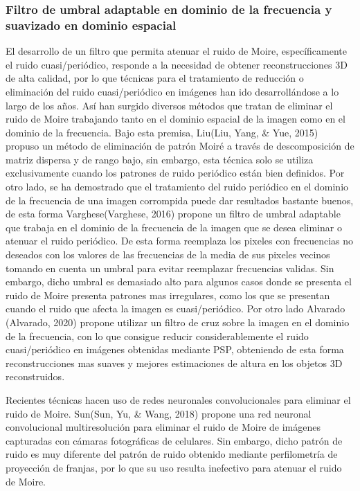 \documentclass[10pt,letterpaper]{article}
\begin{document}
\subsubsection{Filtro de umbral adaptable en dominio de la frecuencia y suavizado en dominio espacial}
El desarrollo de un filtro que permita atenuar el ruido de Moire, específicamente el ruido cuasi/periódico, responde a la necesidad de obtener reconstrucciones 3D de alta calidad, por lo que técnicas para el tratamiento de reducción o eliminación del ruido cuasi/periódico en imágenes han ido desarrollándose a lo largo de los años. Así han surgido diversos métodos que tratan de eliminar el ruido de Moire trabajando tanto en el dominio espacial de la imagen como en el dominio de la frecuencia. Bajo esta premisa, Liu(Liu, Yang, \& Yue, 2015)\cite{Liu:Yang} propuso un método de eliminación de patrón Moiré a través de descomposición de matriz dispersa y de rango bajo, sin embargo, esta técnica solo se utiliza exclusivamente cuando los patrones de ruido periódico están bien definidos. Por otro lado, se ha demostrado que el tratamiento del ruido periódico en el dominio de la frecuencia de una imagen corrompida puede dar resultados bastante buenos, de esta forma Varghese(Varghese, 2016)\cite{Varghese:} propone un filtro de umbral adaptable que trabaja en el dominio de la frecuencia de la imagen que se desea eliminar o atenuar el ruido periódico. De esta forma reemplaza los pixeles con frecuencias no deseados con los valores de las frecuencias de la media de sus pixeles vecinos tomando en cuenta un umbral para evitar reemplazar frecuencias validas. Sin embargo, dicho umbral es demasiado alto para algunos casos donde se presenta el ruido de Moire presenta patrones mas irregulares, como los que se presentan cuando el ruido que afecta la imagen es cuasi/periódico. Por otro lado Alvarado (Alvarado, 2020)\cite{Alva:Orte} propone utilizar un filtro de cruz sobre la imagen en el dominio de la frecuencia, con lo que consigue reducir considerablemente el ruido cuasi/periódico en imágenes obtenidas mediante PSP, obteniendo de esta forma reconstrucciones mas suaves y mejores estimaciones de altura en los objetos 3D reconstruidos. %

Recientes técnicas hacen uso de redes neuronales convolucionales para eliminar el ruido de Moire. Sun(Sun, Yu, \& Wang, 2018)\cite{Sun:Yu} propone una red neuronal convolucional multiresolución para eliminar el ruido de Moire de imágenes capturadas con cámaras fotográficas de celulares. Sin embargo, dicho patrón de ruido es muy diferente del patrón de ruido obtenido mediante perfilometría de proyección de franjas, por lo que su uso resulta inefectivo para atenuar el ruido de Moire. 
\end{document}
